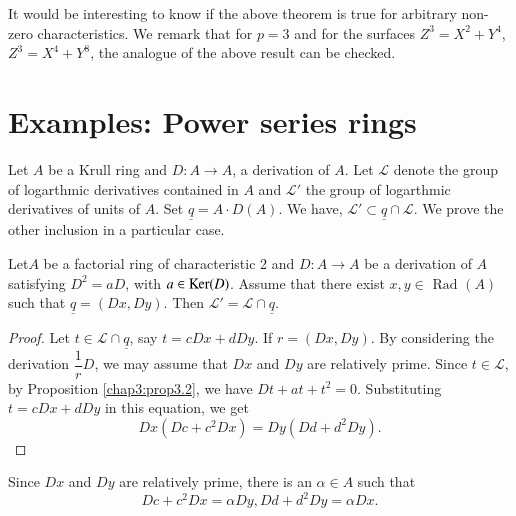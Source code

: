 \begin{remark*} 
It would be interesting to know if the above theorem is true for
arbitrary non-zero characteristics. We remark that for $p = 3$ and for
the surfaces $Z^3 = X^2 + Y^4$, $Z^3 = X^4 + Y^8$, the analogue of the
above result can be checked. 
\end{remark*}   
 
\section{Examples: Power series rings}\label{chap3:sec5}
    
    Let $A$ be a Krull ring and $D:A \to A$, a derivation of $A$. Let
    $\mathscr{L}$ denote the group of logarthmic derivatives contained
    in $A$ and  $\mathscr{L}'$ the group of logarthmic derivatives of
    units of $A$. Set $\underline{q}= A \cdot D(A)$. We have, $\mathscr{L}'
    \subset \underline{q} \cap \mathscr{L}$. We prove the other
    inclusion in a particular case. 

\setcounter{lemma}{0}
    \begin{lemma}\label{chap3:lem5.1} %
Let\pageoriginale $A$ be a factorial ring of characteristic 2 and $D:
A \to A$ be 
a derivation of $A$ satisfying $D^2= aD$, with $a \in \operatorname{Ker}
(D)$. Assume that there exist $x, y \in \text{ Rad  }(A)$ such that
$\underline{q} = (Dx, Dy)$. Then $\mathscr{L}' = \mathscr{L} \cap
\underline{q}$. 
    \end{lemma}  
      

\begin{proof}
Let $t \in \mathscr{L} \cap \underline{q}$, say $t = cDx + d D y$.  If
$r = (Dx, Dy)$. By considering the derivation $\dfrac{1}{r} D$, we
may assume that $Dx$ and $Dy$ are relatively prime. Since $t \in
\mathscr{L}$, by Proposition \ref{chap3:prop3.2}, we have $Dt + at +t^2 =
0$. Substituting $t = cDx + d D y$ in this equation, we get 
$$
Dx (Dc + c^2 Dx) = Dy (Dd + d^2 Dy). 
$$
 \end{proof}    
    
\noindent 
Since $Dx$ and $Dy$ are relatively prime, there is an $\alpha \in A$
such that  
    $$
    Dc + c^2 Dx = \alpha  Dy, Dd + d^2 Dy = \alpha Dx.
    $$
    
